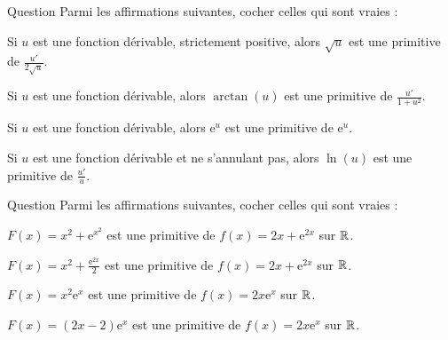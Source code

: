 

\begin{multi}[multiple,feedback=
{On a : \(\displaystyle (\sqrt{u})'=\frac{u'}{2\sqrt{u}}\), \(\displaystyle (\arctan (u))'=\frac{u'}{1+u^2}\) et \(\left(\mathrm{e}^u\right)'=u'\mathrm{e}^u\). Donc \(\displaystyle 2\sqrt{u}\) est une primitive de \(\displaystyle \frac{u'}{\sqrt{u}}\), \(\displaystyle \arctan (u)\) est une primitive de \(\displaystyle \frac{u'}{1+u^2}\) et \(\mathrm{e}^u\) n'est pas une primitive de \(\displaystyle \mathrm{e}^u\). Enfin, \(\ln (u)\) peut ne pas être définie. Il suffit de prendre \(u=-1-x^2\), par exemple.
}]{Question}
Parmi les affirmations suivantes, cocher celles qui sont vraies :

    \item* Si \(u\) est une fonction dérivable, strictement positive, alors \(\sqrt{u}\) est une primitive de \(\displaystyle \frac{u'}{2\sqrt{u}}\).
    \item* Si \(u\) est une fonction dérivable, alors \(\arctan (u)\) est une primitive de \(\displaystyle \frac{u'}{1+u^2}\).
    \item Si \(u\) est une fonction dérivable, alors \(\mathrm{e}^u\) est une primitive de \(\displaystyle \mathrm{e}^u\).
    \item Si \(u\) est une fonction dérivable et ne s'annulant pas, alors \(\ln (u)\) est une primitive de \(\displaystyle \frac{u'}{u}\).
\end{multi}


\begin{multi}[multiple,feedback=
{On calcule \(F'(x)\). Il en découle que \(\displaystyle x^2+\frac{\mathrm{e}^{2x}}{2}\) est une primitive de \(\displaystyle 2x+\mathrm{e}^{2x}\) et que \(\displaystyle (2x-2)\mathrm{e}^{x}\) est une primitive de \(\displaystyle 2x\mathrm{e}^{x}\).
}]{Question}
Parmi les affirmations suivantes, cocher celles qui sont vraies :

    \item \(\displaystyle F(x)=x^2+\mathrm{e}^{x^2}\) est une primitive de \(\displaystyle f(x)=2x+\mathrm{e}^{2x}\) sur \(\mathbb{R}\).
    \item* \(\displaystyle F(x)=x^2+\frac{\mathrm{e}^{2x}}{2}\) est une primitive de \(\displaystyle f(x)=2x+\mathrm{e}^{2x}\) sur \(\mathbb{R}\).
    \item \(\displaystyle F(x)=x^2\mathrm{e}^{x}\) est une primitive de \(\displaystyle f(x)=2x\mathrm{e}^{x}\) sur \(\mathbb{R}\).
    \item* \(\displaystyle F(x)=(2x-2)\mathrm{e}^{x}\) est une primitive de \(\displaystyle f(x)=2x\mathrm{e}^{x}\) sur \(\mathbb{R}\).
\end{multi}


